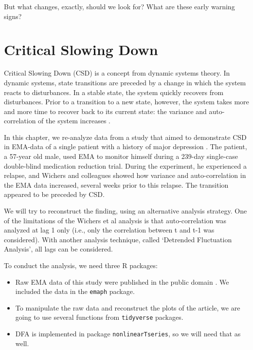 \documentclass[]{book}
\begin{document}
But what changes, exactly, should we look for? What are these early
warning signs?

\section{Critical Slowing Down}\label{critical-slowing-down}


Critical Slowing Down (CSD) is a concept from dynamic systems theory. In
dynamic systems, state transitions are preceded by a change in which the
system reacts to disturbances. In a stable state, the system quickly
recovers from disturbances. Prior to a transition to a new state,
however, the system takes more and more time to recover back to its
current state: the variance and auto-correlation of the system increases
\citep{Scheffer2009, Dakos2008}.

In this chapter, we re-analyze data from a study that aimed to
demonstrate CSD in EMA-data of a single patient with a history of major
depression \citetext{\citealp[
\citet{Kossakowski2017}]{Groot2010}; \citealp{Wichers2016}}. The
patient, a 57-year old male, used EMA to monitor himself during a
239-day single-case double-blind medication reduction trial. During the
experiment, he experienced a relapse, and Wichers and colleagues showed
how variance and auto-correlation in the EMA data increased, several
weeks prior to this relapse. The transition appeared to be preceded by
CSD.

We will try to reconstruct the finding, using an alternative analysis
strategy. One of the limitations of the Wichers et al analysis is that
auto-correlation was analyzed at lag 1 only (i.e., only the correlation
between t and t-1 was considered). With another analysis technique,
called `Detrended Fluctuation Analysis', all lags can be considered.

To conduct the analysis, we need three R packages: 
 

\begin{itemize}
\item
  Raw EMA data of this study were published in the public domain
  \citep{Kossakowski2017}. We included the data in the \texttt{emaph}
  package.
\item
  To manipulate the raw data and reconstruct the plots of the article,
  we are going to use several functions from \texttt{tidyverse}
  packages.
\item
  DFA is implemented in package \texttt{nonlinearTseries}, so we will
  need that as well.
\end{itemize}
\end{document}
